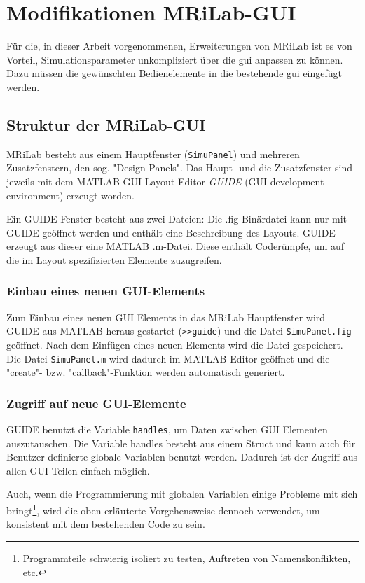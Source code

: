 \clearpage
\section{Modifikationen MRiLab-GUI}%
\label{sec:guiMod}
Für die, in dieser Arbeit vorgenommenen, Erweiterungen von MRiLab ist es von Vorteil, Simulationsparameter unkompliziert über die \gls{gui} anpassen zu können. Dazu müssen die gewünschten Bedienelemente in die bestehende \gls{gui} eingefügt werden.

\subsection{Struktur der MRiLab-GUI}
MRiLab besteht aus einem Hauptfenster (\texttt{SimuPanel}) und mehreren Zusatzfenstern, den sog. "Design Panels". Das Haupt- und die Zusatzfenster sind jeweils mit dem MATLAB-GUI-Layout Editor \textit{GUIDE} (GUI development environment) erzeugt worden.

Ein GUIDE Fenster besteht aus zwei Dateien: Die .fig Binärdatei kann nur mit GUIDE geöffnet werden und enthält eine Beschreibung des Layouts. GUIDE erzeugt aus dieser eine MATLAB .m-Datei. Diese enthält Coderümpfe, um auf die im Layout spezifizierten Elemente zuzugreifen.

\subsubsection{Einbau eines neuen GUI-Elements}
Zum Einbau eines neuen GUI Elements in das MRiLab Hauptfenster wird GUIDE aus MATLAB heraus gestartet (\texttt{>>guide}) und die Datei \texttt{SimuPanel.fig} geöffnet. Nach dem Einfügen eines neuen Elements wird die Datei gespeichert. Die Datei \texttt{SimuPanel.m} wird dadurch im MATLAB Editor geöffnet und die "create"- bzw. "callback"-Funktion werden automatisch generiert.

\subsubsection{Zugriff auf neue GUI-Elemente}
GUIDE benutzt die Variable \texttt{handles}, um Daten zwischen GUI Elementen auszutauschen. Die Variable handles besteht aus einem Struct und kann auch für Benutzer-definierte globale Variablen benutzt werden. Dadurch ist der Zugriff aus allen GUI Teilen einfach möglich.

Auch, wenn die Programmierung mit globalen Variablen einige Probleme mit sich bringt\footnote{Programmteile schwierig isoliert zu testen, Auftreten von Namenskonflikten, etc.}, wird die oben erläuterte Vorgehensweise dennoch verwendet, um konsistent mit dem bestehenden Code zu sein.

